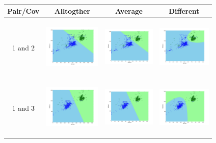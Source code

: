 \documentclass[a4paper]{article}
\begin{document}
			\begin{figure}
				\begin{tabular}{|c|c|c|c|}
					\hline
					Pair/Cov &  Alltogther & Average & Different	\\
					\hline
					1 and
					2&\includegraphics[width=40mm,height=30mm]{bayes/real/pair/12/all_cov.png}&\includegraphics[width=40mm,height=30mm]{bayes/real/pair/12/avg_cov.png}
					&\includegraphics[width=40mm,height=30mm]{bayes/real/pair/12/diff_cov.png}\\
					\hline
					1 and
					3&\includegraphics[width=40mm,height=30mm]{bayes/real/pair/13/all_cov.png}&\includegraphics[width=40mm,height=30mm]{bayes/real/pair/13/all_cov.png}
					&\includegraphics[width=40mm,height=30mm]{bayes/real/pair/13/diff_cov.png}\\

\end{tabular}
\end{figure}
\end{document}
